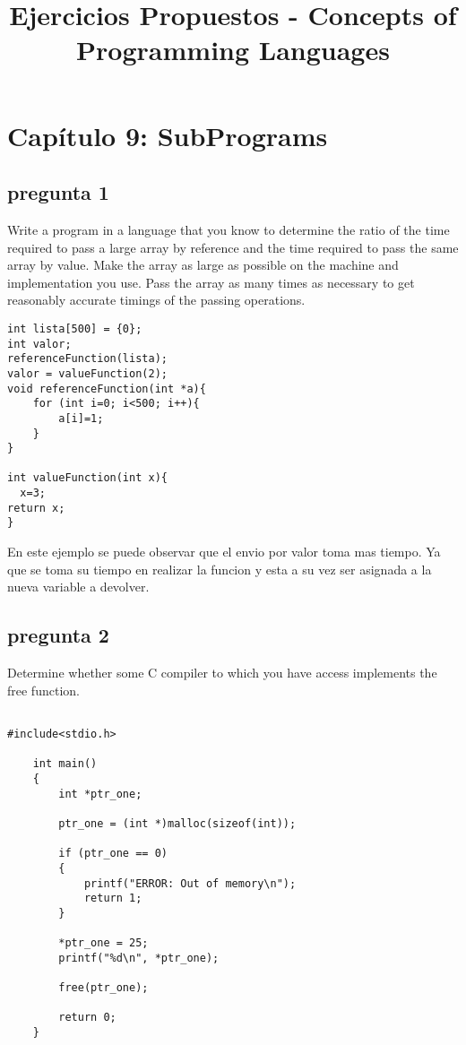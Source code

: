 \documentclass[12pt,oneside]{article}
\title{Ejercicios Propuestos - Concepts of Programming Languages}
\author{}
\begin{document}
\maketitle

\section{Cap\'itulo 9: SubPrograms}

\subsection{pregunta 1}
Write a program in a language that you know to determine the ratio of the time required to pass a large array by reference and the time required to pass the same array by value. Make the array as large as possible on the machine and implementation you use. Pass the array as many times as necessary to get reasonably accurate timings of the passing operations.\\

\begin{lstlisting}[frame=single] % Start your code-block
int lista[500] = {0};
int valor;
referenceFunction(lista);
valor = valueFunction(2);
void referenceFunction(int *a){
	for (int i=0; i<500; i++){
		a[i]=1;
	}
}

int valueFunction(int x){
  x=3;
return x;
}
\end{lstlisting}

En este ejemplo se puede observar que el envio por valor toma mas tiempo. Ya que se toma su tiempo en realizar la funcion y esta a su vez ser asignada a la nueva variable a devolver.\\


\subsection{pregunta 2}
Determine whether some C compiler to which you have access implements the free function.
\begin{lstlisting}[frame=single]

#include<stdio.h>

	int main()
	{
		int *ptr_one;

		ptr_one = (int *)malloc(sizeof(int));

		if (ptr_one == 0)
		{
			printf("ERROR: Out of memory\n");
			return 1;
		}

		*ptr_one = 25;
		printf("%d\n", *ptr_one);

		free(ptr_one);

		return 0;
	}
\end{lstlisting}
\end{document}

